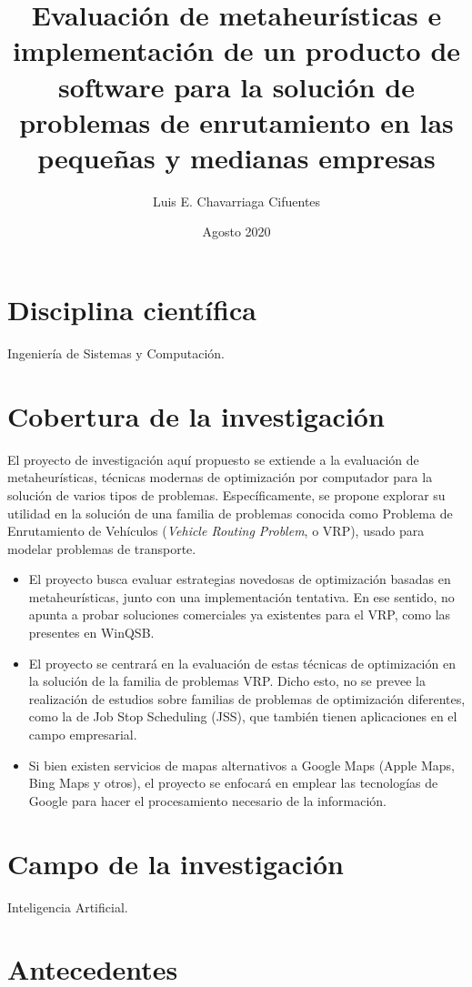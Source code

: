 \documentclass[12pt]{extarticle}
\title{Evaluación de metaheurísticas e implementación de un producto de software
  para la solución de problemas de enrutamiento en las pequeñas y medianas
  empresas}
\author{Luis E. Chavarriaga Cifuentes}
\date{Agosto 2020}
\begin{document}
\maketitle

\section{Disciplina científica}
Ingeniería de Sistemas y Computación.

\section{Cobertura de la investigación}
El proyecto de investigación aquí propuesto se extiende a la evaluación de
metaheurísticas, técnicas modernas de optimización por computador para la
solución de varios tipos de problemas. Específicamente, se propone explorar su
utilidad en la solución de una familia de problemas conocida como Problema de
Enrutamiento de Vehículos (\textit{Vehicle Routing Problem}, o VRP), usado para
modelar problemas de transporte.

\begin{itemize}
\item El proyecto busca evaluar estrategias novedosas de optimización basadas en
  metaheurísticas, junto con una implementación tentativa. En ese sentido, no
  apunta a probar soluciones comerciales ya existentes para el VRP, como las
  presentes en WinQSB.
\item El proyecto se centrará en la evaluación de estas técnicas de optimización
  en la solución de la familia de problemas VRP. Dicho esto, no se prevee la
  realización de estudios sobre familias de problemas de optimización
  diferentes, como la de Job Stop Scheduling (JSS), que también tienen
  aplicaciones en el campo empresarial.
\item Si bien existen servicios de mapas alternativos a Google Maps (Apple Maps,
  Bing Maps y otros), el proyecto se enfocará en emplear las tecnologías de
  Google para hacer el procesamiento necesario de la información.
\end{itemize}

\section{Campo de la investigación}
Inteligencia Artificial.

\section{Antecedentes}
\end{document}
